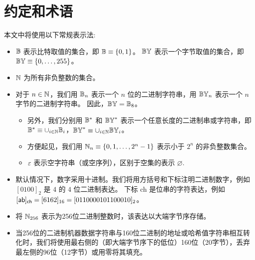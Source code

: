 
\section{约定和术语}

本文中将使用以下常规表示法:  
\begin{itemize}[nosep]
	\item $\mathbb{B}$ 表示比特取值的集合，即 $\mathbb{B}\equiv  \{ 0, 1 \} $。
	$\mathbb{BY}$ 表示一个字节取值的集合，即 $\mathbb{BY}\equiv {\left \{{0,\dots,255} \right \}}$。
	
	
	\item $\mathbb{N}$ 为所有非负整数的集合。
	
	
	\item 对于 $n\in \mathbb{N}$，我们用 $\mathbb{B}_n$ 表示一个 $n$ 位的二进制字符串，用 $\mathbb{BY}_n$ 表示一个 $n$ 字节的二进制字符串。
	因此，$\mathbb{BY}=\mathbb{B}_8$。
	\begin{itemize}[nosep]
		\item 另外，我们分别用 $\mathbb{B}^*$  和 $\mathbb{BY}^*$ 表示一个任意长度的二进制串或字符串，即 $\mathbb{B}^*\equiv \cup_{i\in\mathbb{N}} \mathbb{B}_i$，$\mathbb{BY}^*\equiv \cup_{i\in\mathbb{N}} \mathbb{BY}_i$。
		
		\item 方便起见，我们用 $\mathbb{N}_{n}\equiv{\left \{{0,1,\dots, 2^n-1} \right \}}$  表示小于 $2^n$ 的非负整数集合。
		
		\item $\mathbb{\varepsilon}$ 表示空字符串（或空序列），区别于空集的表示 $\varnothing$.
	\end{itemize}
	
	
	\item 默认情况下，数字采用十进制。我们将用方括号和下标注明二进制数字，例如 $[0100]_2$ 是 $4$ 的 $4$ 位二进制表达。
	下标 \textsf{ch} 是位串的字符表达，例如 $[{\sf ab}]_{\sf ch}=[6162]_{16}=[0110000101100010]_2$。
	
	
	\item 将 $\mathbb{N}_{256}$ 表示为256位二进制整数时，该表达以大端字节序存储。
	
	
	\item 当256位的二进制机器数据字符串与160位二进制的地址或哈希值字符串相互转化时，我们将使用最右侧的（即大端字节序下的低位）160位（20字节），丢弃最左侧的96位（12字节）或用零将其填充。	
	

\end{itemize}
